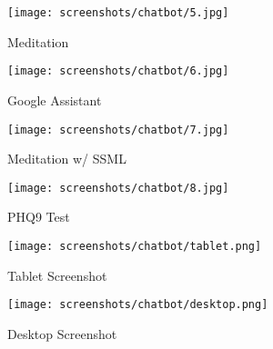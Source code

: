 \pagebreak

\vspace*{\fill}
\begin{figure}[H]
    \centering
    \begin{minipage}{0.45\textwidth}
        \centering
        \texttt{[image: screenshots/chatbot/5.jpg]}
        \caption{Meditation}
    \end{minipage}\hfill
    \begin{minipage}{0.45\textwidth}
        \centering
        \texttt{[image: screenshots/chatbot/6.jpg]}
        \caption{Google Assistant}
    \end{minipage}
\end{figure}
\vspace*{\fill}

\pagebreak

\vspace*{\fill}
\begin{figure}[H]
    \centering
    \begin{minipage}{0.45\textwidth}
        \centering
        \texttt{[image: screenshots/chatbot/7.jpg]}
        \caption{Meditation w/ SSML}
    \end{minipage}\hfill
    \begin{minipage}{0.45\textwidth}
        \centering
        \texttt{[image: screenshots/chatbot/8.jpg]}
        \caption{PHQ9 Test}
    \end{minipage}
\end{figure}
\vspace*{\fill}

\pagebreak

\vspace*{\fill}
\begin{figure}[H]
    \centering
    \texttt{[image: screenshots/chatbot/tablet.png]}
    \caption{Tablet Screenshot}
\end{figure}

\begin{figure}[H]
    \centering
    \texttt{[image: screenshots/chatbot/desktop.png]}
    \caption{Desktop Screenshot}
\end{figure}
\vspace*{\fill}